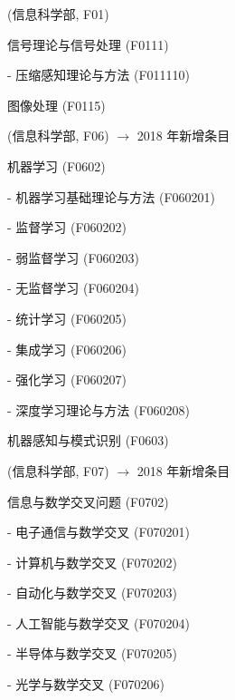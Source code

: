 \begin{Block}
\begin{blist}
		\item[]  (信息科学部, F01)
		\begin{blist}
			\item 信号理论与信号处理 (F0111)
			\begin{blist}
				\item[-] 压缩感知理论与方法 (F011110)
			\end{blist}
			\item 图像处理 (F0115)
		\end{blist}
		
		\item[]  (信息科学部, F06) $\to$ {\color{red} 2018 年新增条目}
		\begin{blist}
			\item 机器学习 (F0602)
			\begin{blist}
				\item[-] 机器学习基础理论与方法 (F060201)
				\item[-] 监督学习 (F060202)
				\item[-] 弱监督学习 (F060203)
				\item[-] 无监督学习 (F060204)
				\item[-] 统计学习 (F060205)
				\item[-] 集成学习 (F060206)
				\item[-] 强化学习 (F060207)
				\item[-] 深度学习理论与方法 (F060208)
			\end{blist}
			\item 机器感知与模式识别 (F0603)
		\end{blist}
		
		\item[]  (信息科学部, F07) $\to$ {\color{red} 2018 年新增条目}
		\begin{blist}
			\item 信息与数学交叉问题 (F0702)
			\begin{blist}
				\item[-] 电子通信与数学交叉 (F070201)
				\item[-] 计算机与数学交叉 (F070202)
				\item[-] 自动化与数学交叉 (F070203)
				\item[-] 人工智能与数学交叉 (F070204)
				\item[-] 半导体与数学交叉 (F070205)
				\item[-] 光学与数学交叉 (F070206)
			\end{blist}
		\end{blist}
	\end{blist}
\end{Block}



